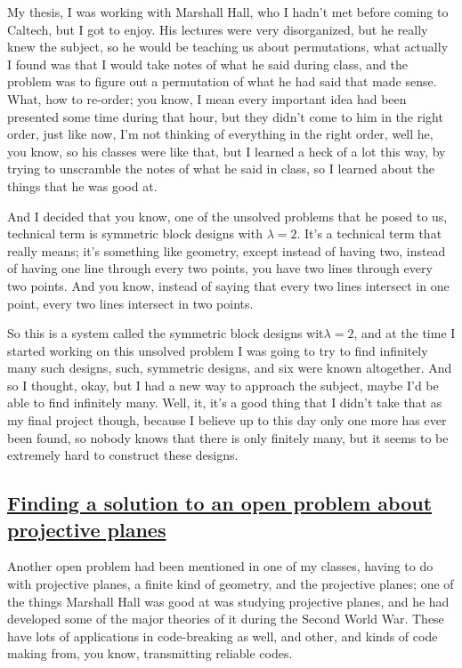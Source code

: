 \documentclass[]{article}
\begin{document}
My thesis, I was working with Marshall Hall, who I hadn't met before
coming to Caltech, but I got to enjoy. His lectures were very
disorganized, but he really knew the subject, so he would be teaching us
about permutations, what actually I found was that I would take notes of
what he said during class, and the problem was to figure out a
permutation of what he had said that made sense. What, how to re-order;
you know, I mean every important idea had been presented some time
during that hour, but they didn't come to him in the right order, just
like now, I'm not thinking of everything in the right order, well he,
you know, so his classes were like that, but I learned a heck of a lot
this way, by trying to unscramble the notes of what he said in class, so
I learned about the things that he was good at.

And I decided that you know, one of the unsolved problems that he posed
to us, technical term is symmetric block designs with $\lambda=2$. It's a
technical term that really means; it's something like geometry, except
instead of having two, instead of having one line through every two
points, you have two lines through every two points. And you know,
instead of saying that every two lines intersect in one point, every two
lines intersect in two points.

So this is a system called the symmetric block designs wit$\lambda=2$, and at
the time I started working on this unsolved problem I was going to try
to find infinitely many such designs, such, symmetric designs, and six
were known altogether. And so I thought, okay, but I had a new way to
approach the subject, maybe I'd be able to find infinitely many. Well,
it, it's a good thing that I didn't take that as my final project
though, because I believe up to this day only one more has ever been
found, so nobody knows that there is only finitely many, but it seems to
be extremely hard to construct these designs.

\subsection{\texorpdfstring{\href{http://webofstories.com/play/17091}{Finding
a solution to an open problem about projective
planes}}{Finding a solution to an open problem about projective planes}}\label{finding-a-solution-to-an-open-problem-about-projective-planes}

Another open problem had been mentioned in one of my classes, having to
do with projective planes, a finite kind of geometry, and the projective
planes; one of the things Marshall Hall was good at was studying
projective planes, and he had developed some of the major theories of it
during the Second World War. These have lots of applications in
code-breaking as well, and other, and kinds of code making from, you
know, transmitting reliable codes.
\end{document}
